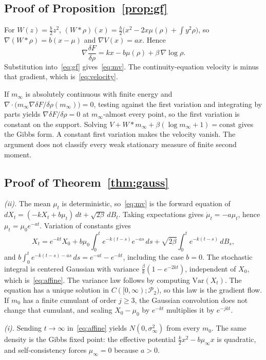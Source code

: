 \documentclass[anon,11pt]{alt2027}
\providecommand{\qed}{\hfill\BlackBox}
\newcommand{\Ptwo}{\mathcal{P}_2}
\newcommand{\Var}{\mathrm{Var}}
\begin{document}
\subsection{Proof of Proposition~\ref{prop:gf}}

For $W(z)=\frac b2 z^2$,
$(W\ast\rho)(x)=\frac b2\bigl(x^2-2x\mu(\rho)+\int y^2\rho\bigr)$, so
$\nabla(W\ast\rho)=b(x-\mu)$ and $\nabla V(x)=ax$. Hence
\[
\nabla\frac{\delta F}{\delta\rho}
=
kx-b\mu(\rho)+\beta\,\nabla\log\rho.
\]
Substitution into~\eqref{eq:gf} gives~\eqref{eq:mv}. The continuity-equation
velocity is minus that gradient, which is~\eqref{eq:velocity}.

If $m_\infty$ is absolutely continuous with finite energy and
$\nabla\cdot\bigl(m_\infty\nabla\delta F/\delta\rho(m_\infty)\bigr)=0$,
testing against the first variation and integrating by parts yields
$\nabla\delta F/\delta\rho=0$ at $m_\infty$-almost every point, so the first
variation is constant on the support. Solving
$V+W\ast m_\infty+\beta(\log m_\infty+1)=\mathrm{const}$ gives the Gibbs form.
A constant first variation makes the velocity vanish. The argument does not
classify every weak stationary measure of finite second moment.\qed

\subsection{Proof of Theorem~\ref{thm:gauss}}

\emph{(ii).}
The mean $\mu_t$ is deterministic, so~\eqref{eq:mv} is the forward equation of
$dX_t=(-kX_t+b\mu_t)\,dt+\sqrt{2\beta}\,dB_t$. Taking expectations gives
$\dot\mu_t=-a\mu_t$, hence $\mu_t=\mu_0 e^{-at}$. Variation of constants gives
\[
X_t
=
e^{-kt}X_0
+
b\mu_0\int_0^t e^{-k(t-s)}e^{-as}\,ds
+
\sqrt{2\beta}\int_0^t e^{-k(t-s)}\,dB_s,
\]
and $b\int_0^t e^{-k(t-s)-as}\,ds=e^{-at}-e^{-kt}$, including the case $b=0$.
The stochastic integral is centered Gaussian with variance
$\frac{\beta}{k}(1-e^{-2kt})$, independent of $X_0$, which is~\eqref{eq:affine}.
The variance law follows by computing $\Var(X_t)$. The equation has a unique
solution in $C([0,\infty);\Ptwo)$, so this law is the gradient flow.
If $m_0$ has a finite cumulant of order $j\ge 3$, the Gaussian convolution
does not change that cumulant, and scaling $X_0-\mu_0$ by $e^{-kt}$ multiplies
it by $e^{-jkt}$.

\emph{(i).}
Sending $t\to\infty$ in~\eqref{eq:affine} yields $N(0,\sigma_\infty^2)$ from
every $m_0$. The same density is the Gibbs fixed point: the effective potential
$\frac k2 x^2-b\mu_\infty x$ is quadratic, and self-consistency forces
$\mu_\infty=0$ because $a>0$.
\end{document}
